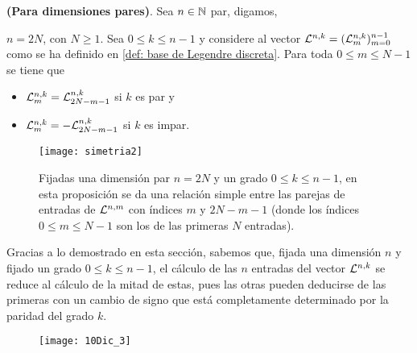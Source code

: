 \begin{teo}
\label{prop: simetrias en dimensiones pares}
\textbf{(Para dimensiones pares)}. Sea $n \in \mathbb{N}$ par, digamos,

$n=2N$, con $N \geq 1$. Sea $0 \leq k \leq n-1$ y
considere al vector $\mathcal{L}^{n,k}=(\mathcal{L}^{n,k}_{m})_{m=0}^{n-1}$
como se ha definido en \eqref{def: base de Legendre discreta}.
Para toda $0 \leq m \leq N-1$ se tiene que
\begin{itemize}
\item $\mathcal{L}^{n,k}_{m} = \mathcal{L}^{n,k}_{2N-m-1}$ si $k$ es par y
\item $\mathcal{L}^{n,k}_{m} = -\mathcal{L}^{n,k}_{2N-m-1}$ si $k$ es impar.
\end{itemize}

\begin{figure}[H]
\centering\captionsetup{format = hang}
	\begin{measuredfigure}
		\texttt{[image: simetria2]} 
		\caption{Fijadas una dimensión par $n=2N$ 
		y un grado $0 \leq k \leq n-1$,
		en esta proposición se da una relación simple entre las parejas 
		de entradas de $\mathcal{L}^{n,m}$ con índices $m$ y $2N-m-1$ 
		(donde los índices $0 \leq m \leq N-1$ son los de las primeras
		$N$ entradas).}
 	\end{measuredfigure}
 \end{figure}
\end{teo}

Gracias a lo demostrado en esta sección, sabemos que,
fijada una dimensión $n$ y fijado un grado $0 \leq k \leq n-1$,
el cálculo de las $n$ entradas del vector $\mathcal{L}^{n,k}$
se reduce al cálculo de la mitad de estas, pues las otras pueden
deducirse de las primeras con un cambio de signo que está completamente
determinado por la paridad del grado $k$.


\begin{figure}[H]
\centering\captionsetup{format = hang}
	\begin{measuredfigure}
		\texttt{[image: 10Dic\_3]} 
		\caption{}
 	\end{measuredfigure}
 \end{figure}
